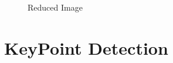 \documentclass[a4paper, nobib]{tufte-handout}
\begin{document}
\begin{enumerate}
\begin{figure}[htpb]
  \centering
\hfill
  \caption{Reduced Image}%
  \label{fig:seam_reduction}
\end{figure}


\end{enumerate}
\section{KeyPoint Detection}%
\label{sec:keypoint_detection}
\end{document}
